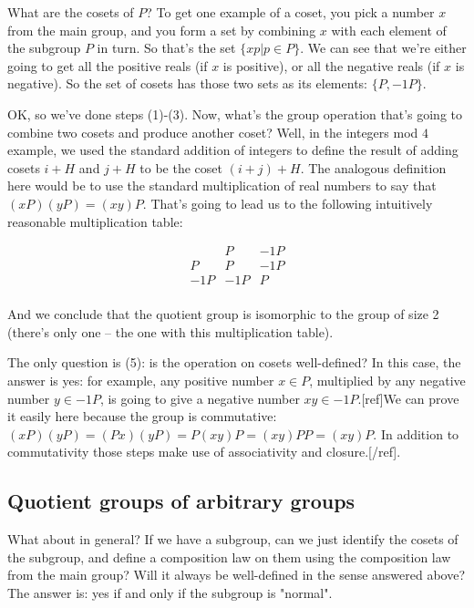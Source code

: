 What are the cosets of $P$? To get one example of a coset, you pick a number
$x$ from the main group, and you form a set by combining $x$ with each element
of the subgroup $P$ in turn. So that's the set $\{xp|p \in P\}$. We can see
that we're either going to get all the positive reals (if $x$ is positive), or
all the negative reals (if $x$ is negative). So the set of cosets has those two
sets as its elements: $\{P, -1P\}$.

OK, so we've done steps (1)-(3). Now, what's the group operation that's going
to combine two cosets and produce another coset? Well, in the integers mod $4$
example, we used the standard addition of integers to define the result of
adding cosets $i+H$ and $j+H$ to be the coset $(i+j)+H$. The analogous
definition here would be to use the standard multiplication of real numbers to
say that $(xP)(yP) = (xy)P$. That's going to lead us to the following
intuitively reasonable multiplication table:

$$
\begin{array}{ c|cc }
 ~   & P   & -1P \\
 \hline
 P   & P   & -1P \\
 -1P & -1P & P \\
\end{array}
$$

And we conclude that the quotient group is isomorphic to the group of size 2
(there's only one -- the one with this multiplication table).

The only question is (5): is the operation on cosets well-defined? In this
case, the answer is yes: for example, any positive number $x \in P$, multiplied
by any negative number $y \in -1P$, is going to give a negative number $xy \in
-1P$.[ref]We can prove it easily here because the group is commutative:
$(xP)(yP) = (Px)(yP) = P(xy)P = (xy)PP = (xy)P$. In addition to commutativity
those steps make use of associativity and closure.[/ref].


\subsection{Quotient groups of arbitrary groups}

What about in general? If we have a subgroup, can we just identify the cosets
of the subgroup, and define a composition law on them using the composition law
from the main group? Will it always be well-defined in the sense answered
above? The answer is: yes if and only if the subgroup is "normal".

